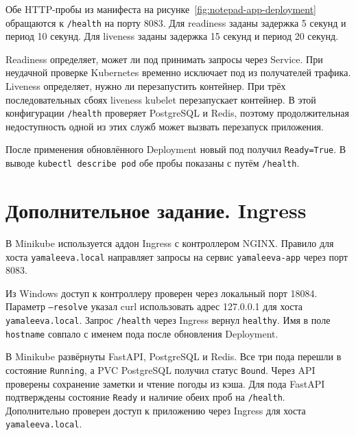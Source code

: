 Обе HTTP-пробы из манифеста на рисунке~\ref{fig:notepad-app-deployment}
обращаются к \texttt{/health} на порту 8083.
Для readiness заданы задержка 5 секунд и период 10 секунд.
Для liveness заданы задержка 15 секунд и период 20 секунд.

Readiness определяет, может ли под принимать запросы через Service.
При неудачной проверке Kubernetes временно исключает под из получателей
трафика. Liveness определяет, нужно ли перезапустить контейнер.
При трёх последовательных сбоях liveness kubelet перезапускает
контейнер. В этой конфигурации \texttt{/health}
проверяет PostgreSQL и Redis, поэтому продолжительная недоступность
одной из этих служб может вызвать перезапуск приложения.

После применения обновлённого Deployment новый под получил
\texttt{Ready=True}. В выводе \texttt{kubectl describe pod}
обе пробы показаны с путём \texttt{/health}.


\clearpage
\section{Дополнительное задание. Ingress}

В Minikube используется аддон Ingress с контроллером NGINX.
Правило для хоста \texttt{yamaleeva.local} направляет запросы на
сервис \texttt{yamaleeva-app} через порт 8083.



Из Windows доступ к контроллеру проверен через локальный порт 18084.
Параметр \texttt{--resolve} указал curl использовать адрес 127.0.0.1
для хоста \texttt{yamaleeva.local}. Запрос \texttt{/health} через
Ingress вернул \texttt{healthy}. Имя в поле \texttt{hostname}
совпало с именем пода после обновления Deployment.



В Minikube развёрнуты FastAPI, PostgreSQL и Redis. Все три пода
перешли в состояние \texttt{Running}, а PVC PostgreSQL получил статус
\texttt{Bound}. Через API проверены сохранение заметки и чтение погоды
из кэша. Для пода FastAPI подтверждены состояние \texttt{Ready}
и наличие обеих проб на \texttt{/health}. Дополнительно проверен доступ к приложению
через Ingress для хоста \texttt{yamaleeva.local}.

